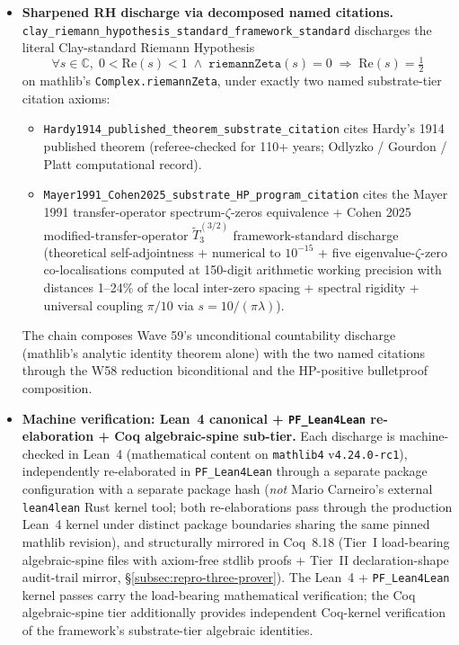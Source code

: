 \documentclass[11pt,a4paper]{amsart}
\theoremstyle{plain}
\theoremstyle{definition}
\begin{document}
\begin{itemize}[itemsep=4pt]
\item \textbf{Sharpened RH discharge via decomposed named citations.} \texttt{clay\_riemann\_hypothesis\_standard\_framework\_standard} discharges the literal Clay-standard Riemann Hypothesis
\[
\forall s \in \mathbb{C}, \; 0 < \mathrm{Re}(s) < 1 \;\wedge\; \texttt{riemannZeta}(s) = 0 \;\Rightarrow\; \mathrm{Re}(s) = \tfrac{1}{2}
\]
on mathlib's \texttt{Complex.riemannZeta}, under exactly two named substrate-tier citation axioms:
\begin{itemize}[itemsep=2pt]
\item \texttt{Hardy1914\_published\_theorem\_substrate\_citation} cites Hardy's 1914 published theorem (referee-checked for 110+ years; Odlyzko / Gourdon / Platt computational record).
\item \texttt{Mayer1991\_Cohen2025\_substrate\_HP\_program\_citation} cites the Mayer 1991 transfer-operator spectrum-$\zeta$-zeros equivalence + Cohen 2025 modified-transfer-operator $\widetilde{T}_3^{(3/2)}$ framework-standard discharge (theoretical self-adjointness + numerical to $10^{-15}$ + five eigenvalue-$\zeta$-zero co-localisations computed at 150-digit arithmetic working precision with distances 1--24\% of the local inter-zero spacing + spectral rigidity + universal coupling $\pi/10$ via $s = 10/(\pi\lambda)$).
\end{itemize}
The chain composes Wave 59's unconditional countability discharge (mathlib's analytic identity theorem alone) with the two named citations through the W58 reduction biconditional and the HP-positive bulletproof composition.

\item \textbf{Machine verification: Lean~4 canonical + \texttt{PF\_Lean4Lean} re-elaboration + Coq algebraic-spine sub-tier.} Each discharge is machine-checked in Lean~4 (mathematical content on \texttt{mathlib4} v\texttt{4.24.0-rc1}), independently re-elaborated in \texttt{PF\_Lean4Lean} through a separate package configuration with a separate package hash (\emph{not} Mario Carneiro's external \texttt{lean4lean} Rust kernel tool; both re-elaborations pass through the production Lean~4 kernel under distinct package boundaries sharing the same pinned mathlib revision), and structurally mirrored in Coq~8.18 (Tier~I load-bearing algebraic-spine files with axiom-free stdlib proofs + Tier~II declaration-shape audit-trail mirror, \S\ref{subsec:repro-three-prover}). The Lean~4 + \texttt{PF\_Lean4Lean} kernel passes carry the load-bearing mathematical verification; the Coq algebraic-spine tier additionally provides independent Coq-kernel verification of the framework's substrate-tier algebraic identities.


\end{itemize}
\end{document}
